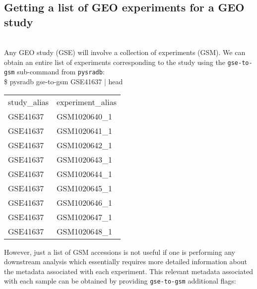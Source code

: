\documentclass[9pt,a4paper]{extarticle}
\newenvironment{allintypewriter}{\ttfamily}{\par}
\begin{document}
\subsection*{Getting a list of GEO experiments for a GEO study}
~\\
Any GEO study (GSE) will involve a collection of experiments (GSM). We can obtain
an entire list of experiments corresponding to the study using the
\texttt{gse-to-gsm} sub-command from \texttt{pysradb}:\\

\begin{allintypewriter}
\$ pysradb gse-to-gsm GSE41637 | head
\begin{table}[H]
    \begin{tabular}{ll}
        study_alias & experiment_alias\\
        GSE41637  &  GSM1020640_1\\
        GSE41637  &  GSM1020641_1\\
        GSE41637  &  GSM1020642_1\\
        GSE41637  &  GSM1020643_1\\
        GSE41637  &  GSM1020644_1\\
        GSE41637  &  GSM1020645_1\\
        GSE41637  &  GSM1020646_1\\
        GSE41637  &  GSM1020647_1\\
        GSE41637  &  GSM1020648_1
    \end{tabular}
\end{table}
\end{allintypewriter}

However, just a list of GSM accessions is not useful if one is performing any downstream
analysis which essentially requires more detailed information about the metadata
associated with each experiment. This relevant metadata associated with each sample can be obtained by providing \texttt{gse-to-gsm} additional flags:\\
\end{document}

